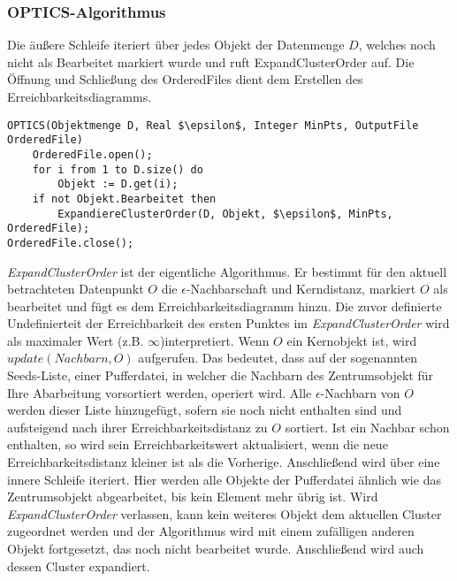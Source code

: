 \documentclass[11pt,ceqn]{book}
\begin{document}
\subsubsection{OPTICS-Algorithmus}

Die äußere Schleife iteriert über jedes Objekt der Datenmenge $D$, welches noch nicht als Bearbeitet markiert wurde und ruft ExpandClusterOrder auf. Die Öffnung und Schließung des OrderedFiles dient dem Erstellen des Erreichbarkeitsdiagramms.
\begin{minipage}{\linewidth} %
\begin{lstlisting}[frame=single,mathescape=true]
OPTICS(Objektmenge D, Real $\epsilon$, Integer MinPts, OutputFile OrderedFile)
	OrderedFile.open();
	for i from 1 to D.size() do
		Objekt := D.get(i);
	if not Objekt.Bearbeitet then
		ExpandiereClusterOrder(D, Objekt, $\epsilon$, MinPts, OrderedFile);
OrderedFile.close();
\end{lstlisting}
\end{minipage}


\textit{ExpandClusterOrder} ist der eigentliche Algorithmus. Er bestimmt für den aktuell betrachteten Datenpunkt $O$ die $\epsilon$-Nachbarschaft und Kerndistanz, markiert $O$ als bearbeitet und fügt es dem Erreichbarkeitsdiagramm hinzu. Die zuvor definierte Undefinierteit der Erreichbarkeit des ersten Punktes im \textit{ExpandClusterOrder} wird als maximaler Wert (z.B. $\infty$)interpretiert.
Wenn $O$ ein Kernobjekt ist, wird $update(Nachbarn, O)$ aufgerufen. Das bedeutet, dass auf der sogenannten Seeds-Liste, einer Pufferdatei, in welcher die Nachbarn des Zentrumsobjekt für Ihre Abarbeitung vorsortiert werden, operiert wird. Alle $\epsilon$-Nachbarn von $O$ werden dieser Liste hinzugefügt, sofern sie noch nicht enthalten sind und aufsteigend nach ihrer Erreichbarkeitsdistanz zu $O$ sortiert. Ist ein Nachbar schon enthalten, so wird sein Erreichbarkeitswert aktualisiert, wenn die neue Erreichbarkeitsdistanz kleiner ist als die Vorherige.
Anschließend wird über eine innere Schleife iteriert. Hier werden alle Objekte der Pufferdatei ähnlich wie das Zentrumsobjekt abgearbeitet, bis kein Element mehr übrig ist. Wird \textit{ExpandClusterOrder} verlassen, kann kein weiteres Objekt dem aktuellen Cluster zugeordnet werden und der Algorithmus wird mit einem zufälligen anderen Objekt fortgesetzt, das noch nicht bearbeitet wurde. Anschließend wird auch dessen Cluster expandiert.
\end{document}
